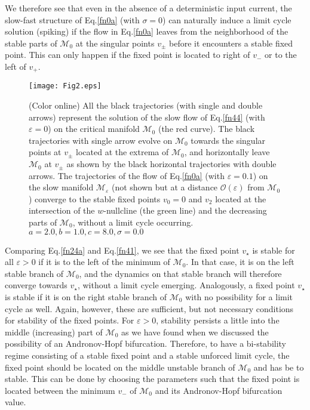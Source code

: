 We therefore see that 
even in the absence of a deterministic input current,
the slow-fast structure of Eq.\eqref{fn0a} (with $\sigma=0$) can
naturally induce a limit cycle solution (spiking) if
the flow in Eq.\eqref{fn0a} leaves from the neighborhood of the stable parts of  
$\mathcal{M}_0$ at the singular points $v_{\pm}$ before 
it encounters a stable fixed point. This can only
happen if the fixed point is located to right of $v_-$ or 
to the left of $v_+$.
\begin{figure}%
\begin{center}
\texttt{[image: Fig2.eps]}
\caption{(Color online) All the black trajectories (with single and double arrows) represent the solution of the slow flow of 
Eq.\eqref{fn44} (with $\varepsilon=0$) on the critical manifold $\mathcal{M}_0$ (the red curve).
The black trajectories with single arrow evolve on $\mathcal{M}_0$ towards 
the singular points at $v_\pm$ located at the extrema of $\mathcal{M}_0$, and horizontally leave
$\mathcal{M}_0$ at $v_\pm$ as shown by the black horizontal trajectories with double arrows.
The trajectories of the flow of Eq.\eqref{fn0a} (with $\varepsilon=0.1$) on the slow manifold $\mathcal{M}_{\varepsilon}$ (not shown but at a distance $\mathcal{O}(\varepsilon)$
from $\mathcal{M}_0$) converge to the stable fixed points $v_0=0$ and $v_2$ located at the intersection of the $w$-nullcline (the green line) and the decreasing parts of $\mathcal{M}_{0}$, 
without a limit cycle occurring.
$a=2.0, b=1.0, c=8.0, \sigma=0.0$} \label{fig:chap320}
\end{center}
\end{figure}

Comparing Eq.\eqref{fn24a} and Eq.\eqref{fn41}, we see that the fixed
point $v_\star$ is stable for all $\varepsilon >0$ if it is to the
left of the minimum of $\mathcal{M}_0$. In that case,  
it is on the left stable branch of $\mathcal{M}_0$, and the 
dynamics on that stable branch will therefore converge towards $v_\star$, 
without a limit cycle emerging. Analogously, a fixed
point $v_\star$ is stable if it is on the right stable branch of 
$\mathcal{M}_0$ with no possibility for a limit cycle as well.
Again, however, these are sufficient, but
not necessary conditions for stability of the fixed points. 
For $\varepsilon>0$, stability persists a little into the middle 
(increasing) part of $\mathcal{M}_0$ as we have found when we discussed the
possibility of an Andronov-Hopf bifurcation. Therefore, to have a bi-stability 
regime consisting of a stable fixed point and a stable unforced limit cycle, 
the fixed point should be located on the middle unstable branch of $\mathcal{M}_0$ and 
has be to stable. This can be done by choosing the parameters
such that the fixed point is located between the minimum $v_-$ of $\mathcal{M}_0$ 
and its Andronov-Hopf bifurcation value. 

